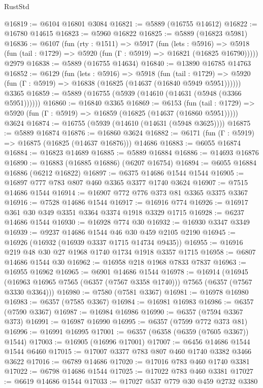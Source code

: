 \begin{lexlean}{RustStd}
\begin{coremodule}
@16819 := @6104 @16801 @3084
@16821 := @5889 (@16755 @14612)
@16822 := @16780 @14615
@16823 := @5960 @16822
@16825 := @5889 (@16823 @5981)
@16836 := @6107
    (fun (rty : @1511) =>
    @5917
      (fun (lets : @5916) =>
      @5918 (fun (tail : @1729) => @5920 (fun (Γ : @5919) => @16821 (@16825 @16790)))))
    @2979
@16838 := @5889 (@16755 @14634)
@16840 := @13890 @16785 @14763
@16852 := @6129
    (fun (lets : @5916) =>
    @5918
      (fun (tail : @1729) =>
      @5920 (fun (Γ : @5919) => @16838 (@16825 (@14637 (@16840 @5949 @5951))))))
    @3365
@16859 := @5889 (@16755 (@5939 (@14610 (@14631 (@5948 (@3366 @5951))))))
@16860 := @16840 @3365
@16869 := @6153
    (fun (tail : @1729) => @5920 (fun (Γ : @5919) => @16859 (@16825 (@14637 (@16860 @5951)))))
    @3624
@16874 := @16755 (@5939 (@14610 (@14631 (@5948 @3625))))
@16875 := @5889 @16874
@16876 := @16860 @3624
@16882 := @6171 (fun (Γ : @5919) => @16875 (@16825 (@14637 @16876))) @14686
@16883 := @6055 @16874
@16884 := @16823 @14689
@16885 := @5889 @16884
@16886 := @14693 @16876
@16890 := @16883 (@16885 @16886) (@6207 @16754)
@16894 := @6055 @16884 @16886 (@6212 @16822)
@16897 := @6375 @14686 @1544 @1544
@16905 := @16897 @777 @783 @807 @460 @3365 @3377 @1740 @3624
@16907 := @7515 @14686 @1544
@16914 := @16907 @772 @776 @373 @81 @3365 @3375 @3367
@16916 := @7528 @14686 @1544
@16917 := @16916 @774
@16926 := @16917 @361 @30 @349 @3351 @3364 @3374 @1918 @3329 @1715
@16928 := @6237 @14686 @1544
@16930 := @16928 @774 @30
@16932 := @16930 @3347 @3349
@16939 := @9237 @14686 @1544 @46 @30 @459 @2105 @2190
@16945 := @16926 (@16932 (@16939 @3337 @1715 @14734 @9435))
@16955 := @16916 @219 @48 @30 @27 @1968 @1740 @1734 @1918 @3357 @1715
@16958 := @6807 @14686 @1544 @30
@16962 := @16958 @218 @1968 @7833 @7837
@16963 := @16955 @16962
@16965 := @6901 @14686 @1544
@16978 := @16914
    (@16945 (@16963 @16965 @7565 (@6357 (@7567 @3358 @1740))) @7565 (@6357 (@7567 @3330 @3364)))
@16980 := @7580 (@7581 @3367)
@16981 := @16978 @16980
@16983 := @6357 (@7585 @3367)
@16984 := @16981 @16983
@16986 := @6357 (@7590 @3367)
@16987 := @16984 @16986
@16990 := @6357 (@7594 @3367 @373)
@16991 := @16987 @16990
@16995 := @6357 (@7599 @772 @373 @81)
@16996 := @16991 @16995
@17001 := @6357 (@6358 (@6359 (@7605 @3367)) @1544)
@17003 := @16905 (@16996 @17001)
@17007 := @6456 @14686 @1544 @1544 @6460
@17015 := @17007 @3377 @783 @807 @460 @1740 @3382 @3466 @3622
@17016 := @6789 @14686
@17020 := @17016 @783 @460 @1740 @3381
@17022 := @6798 @14686 @1544
@17025 := @17022 @783 @460 @3381
@17027 := @6619 @14686 @1544
@17033 := @17027 @537 @779 @30 @459 @2732 @3380

\end{coremodule}
\end{lexlean}
